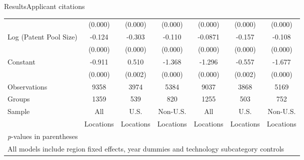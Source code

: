 \documentclass{beamer}
\begin{document}
\begin{frame}{Results}{Applicant citations}
{\begin{tabular}{l*{6}{c}}
                &  (0.000)&  (0.000)&  (0.000)&  (0.000)&  (0.000)&  (0.000)\\
Log (Patent Pool Size)&   -0.124&   -0.303&   -0.110&  -0.0871&   -0.157&   -0.108\\
                &  (0.000)&  (0.000)&  (0.000)&  (0.000)&  (0.000)&  (0.000)\\
Constant        &   -0.911&    0.510&   -1.368&   -1.296&   -0.557&   -1.677\\
                &  (0.000)&  (0.002)&  (0.000)&  (0.000)&  (0.002)&  (0.000)\\
\hline
Observations    &     9358&     3974&     5384&     9037&     3868&     5169\\
Groups          &     1359&      539&      820&     1255&      503&      752\\
Sample&All &U.S. &Non-U.S.&All &U.S. &Non-U.S. \\
          &Locations &Locations&Locations&Locations &Locations&Locations \\\hline\hline
\multicolumn{7}{l}{\footnotesize \textit{p}-values in parentheses}\\
\multicolumn{7}{l}{\footnotesize All models include region fixed effects, year dummies and technology subcategory controls}\\
\end{tabular}
}
\end{frame}
\end{document}
